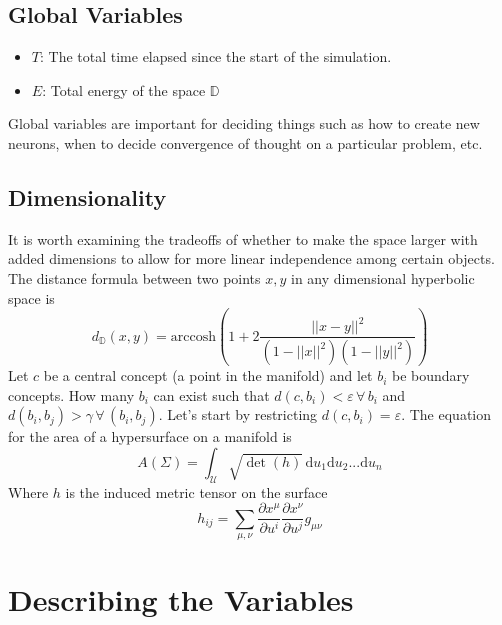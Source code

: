 \documentclass{article}
\newcommand{\D}{\mathrm{d}}
\begin{document}
\subsection{Global Variables}
\begin{itemize}
    \item $T$: The total time elapsed since the start of the simulation.
    \item $E$: Total energy of the space $\mathbb{D}$
\end{itemize}
Global variables are important for deciding things such as how to create new neurons, when to decide convergence of thought on a particular problem, etc.

\subsection{Dimensionality}
It is worth examining the tradeoffs of whether to make the space larger with added dimensions to allow for more linear independence among certain objects. The distance formula between two points $x,y$ in any dimensional hyperbolic space is
\begin{equation} 
d_{\mathbb{D}}(x, y) = \mathrm{arccosh} \left( 1 + 2 \frac{||x - y||^2}{(1 - ||x||^2)(1 - ||y||^2)} \right) 
\end{equation}
Let $c$ be a central concept (a point in the manifold) and let $b_i$ be boundary concepts. How many $b_i$ can exist such that $d(c,b_i) < \varepsilon \, \forall \, b_i $ and $d(b_i,b_j) > \gamma \, \forall \, (b_i,b_j)$. Let's start by restricting $d(c,b_i) = \varepsilon$. The equation for the area of a hypersurface on a manifold is 
\begin{equation}
    A(\Sigma) = \int_\mathcal{U} \sqrt{\det(h)} \, \D u_1 \D u_2...\D u_n
\end{equation}
Where $h$ is the induced metric tensor on the surface
\begin{equation}
    h_{ij} = \sum_{\mu, \nu} \frac{\partial x^\mu}{\partial u^i} \frac{\partial x^\nu}{\partial u^j} g_{\mu \nu} 
\end{equation}


\section{Describing the Variables}
\end{document}
